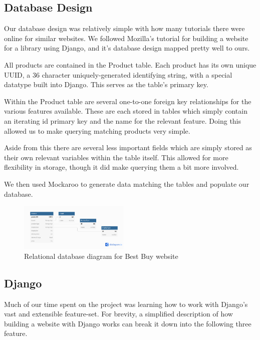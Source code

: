 \documentclass[sigconf]{acmart}
\begin{document}
\subsection{Database Design}\label{database}
Our database design was relatively simple with how many tutorials there were online for similar websites. We followed Mozilla's tutorial for building a website for a library using Django, and it's database design mapped pretty well to ours. \par
All products are contained in the Product table. Each product has its own unique UUID, a 36 character uniquely-generated identifying string, with a special datatype built into Django. This serves as the table's primary key. \par
Within the Product table are several one-to-one foreign key relationships for the various features available. These are each stored in tables which simply contain an iterating id primary key and the name for the relevant feature. Doing this allowed us to make querying matching products very simple. \par
Aside from this there are several less important fields which are simply stored as their own relevant variables within the table itself. This allowed for more flexibility in storage, though it did make querying them a bit more involved. \par
We then used Mockaroo to generate data matching the tables and populate our database.

\begin{figure} [H] %
	\centering %
	\includegraphics[width=0.47\textwidth]{Figures/databaseRelations} %
	\caption{Relational database diagram for Best Buy website}
\end{figure}

\subsection{Django}\label{django}
Much of our time spent on the project was learning how to work with Django's vast and extensible feature-set. For brevity, a simplified description of how building a website with Django works can break it down into the following three feature.
\end{document}

